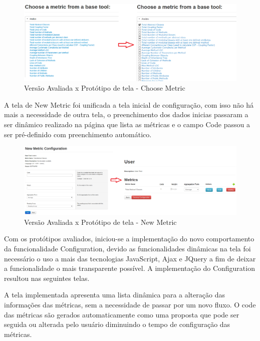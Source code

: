 \graphicspath{{figuras/}}
\begin{figure}[H]
\centering
\includegraphics[width=1.0\textwidth]{PrototipoChooseMetric}
\caption{Versão Avaliada x Protótipo de tela - Choose Metric}
\label{parallel-coordinate}
\end{figure}

A tela de New Metric foi unificada a tela inicial de configuração, com isso não há mais a necessidade de outra tela, o preenchimento dos dados inicias passaram a ser dinâmico realizado na página que lista as métricas e o campo Code passou a ser pré-definido com preenchimento automático. 

\graphicspath{{figuras/}}
\begin{figure}[H]
\centering
\includegraphics[width=1.0\textwidth]{PrototipoNewMetric}
\caption{Versão Avaliada x Protótipo de tela - New Metric}
\label{parallel-coordinate}
\end{figure}

Com os protótipos avaliados, iniciou-se a implementação do novo comportamento da funcionalidade Configuration, devido as funcionalidades dinâmicas na tela foi necessário o uso a mais das tecnologias JavaScript, Ajax e JQuery a fim de deixar a funcionalidade o mais transparente possível. A implementação do Configuration resultou nas seguintes telas.

A tela implementada apresenta uma lista dinâmica para a alteração das informações das métricas, sem a necessidade de passar por um novo fluxo. O code das métricas são gerados automaticamente como uma proposta que pode ser seguida ou alterada pelo usuário diminuindo o tempo de configuração das métricas.


